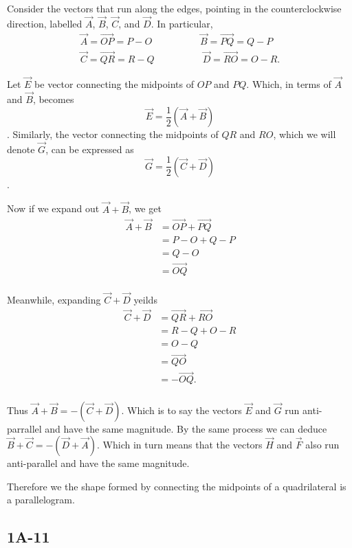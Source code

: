 \documentclass[main.tex]{subfiles}
\begin{document}
Consider the vectors that run along the edges, pointing in the counterclockwise
direction, labelled $\vec{A}$, $\vec{B}$, $\vec{C}$, and $\vec{D}$.
In particular,
\begin{align*}
\vec{A} = \vec{OP} = P - O\hspace{5em}
\vec{B} = \vec{PQ} = Q - P\\
\vec{C} = \vec{QR} = R - Q\hspace{5em}
\vec{D} = \vec{RO} = O - R.
\end{align*}

Let $\vec{E}$ be vector connecting the midpoints of $OP$ and $PQ$.
Which, in terms of $\vec{A}$ and $\vec{B}$, becomes
\[\vec{E} = \frac{1}{2}(\vec{A} + \vec{B})\].
Similarly, the vector connecting the midpoints of $QR$ and $RO$, which
we will denote $\vec{G}$, can be expressed as
\[\vec{G} = \frac{1}{2}(\vec{C} + \vec{D})\].

Now if we expand out $\vec{A} + \vec{B}$, we get
\begin{align*}
\vec{A} + \vec{B} &= \vec{OP} + \vec{PQ}\\
                  &= P - O + Q - P\\
                  &=  Q - O \\
                  &=  \vec{OQ} \\
\end{align*}

Meanwhile, expanding $\vec{C} + \vec{D}$ yeilds
\begin{align*}
\vec{C} + \vec{D} &= \vec{QR} + \vec{RO}\\
                  &= R - Q + O - R\\
                  &=  O - Q \\
                  &=  \vec{QO} \\
                  &=  -\vec{OQ}. \\
\end{align*}

Thus $\vec{A} + \vec{B} = -(\vec{C} + \vec{D})$.
Which is to say the vectors $\vec{E}$ and $\vec{G}$ run anti-parrallel
and have the same magnitude. By the same process we can deduce
$\vec{B}+\vec{C} = -(\vec{D}+\vec{A})$.
Which in turn means that the vectors $\vec{H}$ and $\vec{F}$ also run
anti-parallel  and have the same magnitude.

Therefore we the shape formed by connecting the midpoints of a
quadrilateral is a parallelogram.



\subsection*{1A-11}
\end{document}
